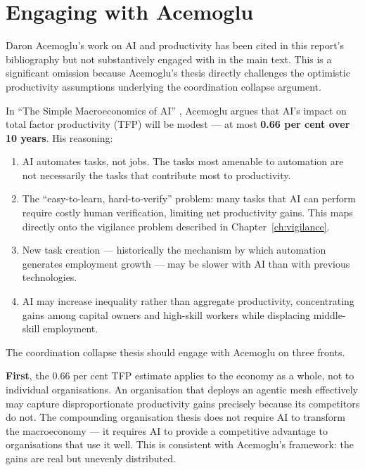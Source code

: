 \section{Engaging with Acemoglu}

Daron Acemoglu's work on AI and productivity has been cited in this report's bibliography but not substantively engaged with in the main text. This is a significant omission because Acemoglu's thesis directly challenges the optimistic productivity assumptions underlying the coordination collapse argument.

\begin{evidencebox}[title={The Acemoglu Sceptical Thesis}]
In ``The Simple Macroeconomics of AI'' \parencite{Acemoglu2025}, Acemoglu argues that AI's impact on total factor productivity (TFP) will be modest --- at most \textbf{0.66 per cent over 10 years}. His reasoning:

\begin{enumerate}
  \item AI automates tasks, not jobs. The tasks most amenable to automation are not necessarily the tasks that contribute most to productivity.
  \item The ``easy-to-learn, hard-to-verify'' problem: many tasks that AI can perform require costly human verification, limiting net productivity gains. This maps directly onto the vigilance problem described in Chapter~\ref{ch:vigilance}.
  \item New task creation --- historically the mechanism by which automation generates employment growth --- may be slower with AI than with previous technologies.
  \item AI may increase inequality rather than aggregate productivity, concentrating gains among capital owners and high-skill workers while displacing middle-skill employment.
\end{enumerate}
\end{evidencebox}

The coordination collapse thesis should engage with Acemoglu on three fronts.

\textbf{First}, the 0.66 per cent TFP estimate applies to the economy as a whole, not to individual organisations. An organisation that deploys an agentic mesh effectively may capture disproportionate productivity gains precisely because its competitors do not. The compounding organisation thesis does not require AI to transform the macroeconomy --- it requires AI to provide a competitive advantage to organisations that use it well. This is consistent with Acemoglu's framework: the gains are real but unevenly distributed.


